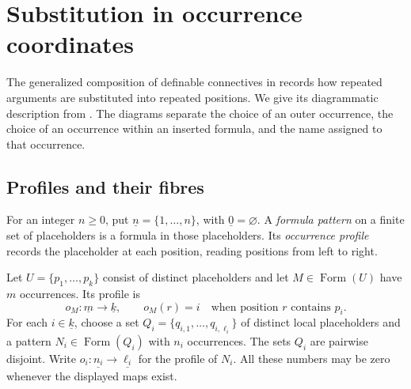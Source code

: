 \documentclass[11pt]{article}
\newcommand{\FormulaSet}{\operatorname{Form}}
\begin{document}
\appendix
\section{Substitution in occurrence coordinates}\label{app:substitution}

The generalized composition of definable connectives in
\cite[\S2.5, pp.~45--46]{DP} records how repeated arguments are
substituted into repeated positions. We give its diagrammatic description
from \cite[\S\S9.2--9.3]{Notation}. The diagrams separate the choice of
an outer occurrence, the choice of an occurrence within an inserted
formula, and the name assigned to that occurrence.

\subsection{Profiles and their fibres}\label{app:profiles}

For an integer $n\geq0$, put $\underline n=\{1,\ldots,n\}$, with
$\underline0=\varnothing$. A \emph{formula pattern} on a finite set
of placeholders is a formula in those placeholders. Its
\emph{occurrence profile} records the placeholder at each position,
reading positions from left to right.

Let $U=\{p_1,\ldots,p_k\}$ consist of distinct placeholders and let
$M\in\FormulaSet(U)$ have $m$ occurrences. Its profile is
\[
 o_M:\underline m\longrightarrow\underline k,
 \qquad o_M(r)=i\quad\text{when position $r$ contains $p_i$}.
\]
For each $i\in\underline k$, choose a set
$Q_i=\{q_{i,1},\ldots,q_{i,\ell_i}\}$ of distinct local placeholders and a
pattern $N_i\in\FormulaSet(Q_i)$ with $n_i$ occurrences. The sets
$Q_i$ are pairwise disjoint. Write
$o_i:\underline{n_i}\to\underline{\ell_i}$ for the profile of $N_i$.
All these numbers may be zero whenever the displayed maps exist.
\end{document}
